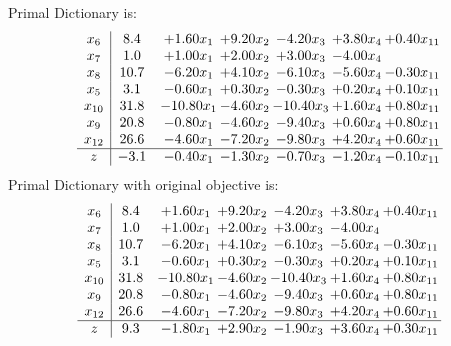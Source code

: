 \documentclass[8pt]{article}
\begin{document}
Primal Dictionary is:
\[\begin{array}{c| c c@{\hskip 2pt} c@{\hskip 2pt} c@{\hskip 2pt} c@{\hskip 2pt} c@{\hskip 2pt} }
 x_{6}   &  8.4 & +  1.60 x_{1} & +  9.20 x_{2} & -4.20 x_{3} & +  3.80 x_{4} & +  0.40 x_{11}\\
 x_{7}   &  1.0 & +  1.00 x_{1} & +  2.00 x_{2} & +  3.00 x_{3} & -4.00 x_{4} &   \\
 x_{8}   &  10.7 & -6.20 x_{1} & +  4.10 x_{2} & -6.10 x_{3} & -5.60 x_{4} & -0.30 x_{11}\\
 x_{5}   &  3.1 & -0.60 x_{1} & +  0.30 x_{2} & -0.30 x_{3} & +  0.20 x_{4} & +  0.10 x_{11}\\
 x_{10}   &  31.8 & -10.80 x_{1} & -4.60 x_{2} & -10.40 x_{3} & +  1.60 x_{4} & +  0.80 x_{11}\\
 x_{9}   &  20.8 & -0.80 x_{1} & -4.60 x_{2} & -9.40 x_{3} & +  0.60 x_{4} & +  0.80 x_{11}\\
 x_{12}   &  26.6 & -4.60 x_{1} & -7.20 x_{2} & -9.80 x_{3} & +  4.20 x_{4} & +  0.60 x_{11}\\
\hline
z    &  -3.1 & -0.40 x_{1} & -1.30 x_{2} & -0.70 x_{3} & -1.20 x_{4} & -0.10 x_{11}\\
\end{array}\]
Primal Dictionary with original objective is:
\[\begin{array}{c| c c@{\hskip 2pt} c@{\hskip 2pt} c@{\hskip 2pt} c@{\hskip 2pt} c@{\hskip 2pt} }
 x_{6}   &  8.4 & +  1.60 x_{1} & +  9.20 x_{2} & -4.20 x_{3} & +  3.80 x_{4} & +  0.40 x_{11}\\
 x_{7}   &  1.0 & +  1.00 x_{1} & +  2.00 x_{2} & +  3.00 x_{3} & -4.00 x_{4} &   \\
 x_{8}   &  10.7 & -6.20 x_{1} & +  4.10 x_{2} & -6.10 x_{3} & -5.60 x_{4} & -0.30 x_{11}\\
 x_{5}   &  3.1 & -0.60 x_{1} & +  0.30 x_{2} & -0.30 x_{3} & +  0.20 x_{4} & +  0.10 x_{11}\\
 x_{10}   &  31.8 & -10.80 x_{1} & -4.60 x_{2} & -10.40 x_{3} & +  1.60 x_{4} & +  0.80 x_{11}\\
 x_{9}   &  20.8 & -0.80 x_{1} & -4.60 x_{2} & -9.40 x_{3} & +  0.60 x_{4} & +  0.80 x_{11}\\
 x_{12}   &  26.6 & -4.60 x_{1} & -7.20 x_{2} & -9.80 x_{3} & +  4.20 x_{4} & +  0.60 x_{11}\\
\hline
z    &  9.3 & -1.80 x_{1} & +  2.90 x_{2} & -1.90 x_{3} & +  3.60 x_{4} & +  0.30 x_{11}\\
\end{array}\]
\end{document}
